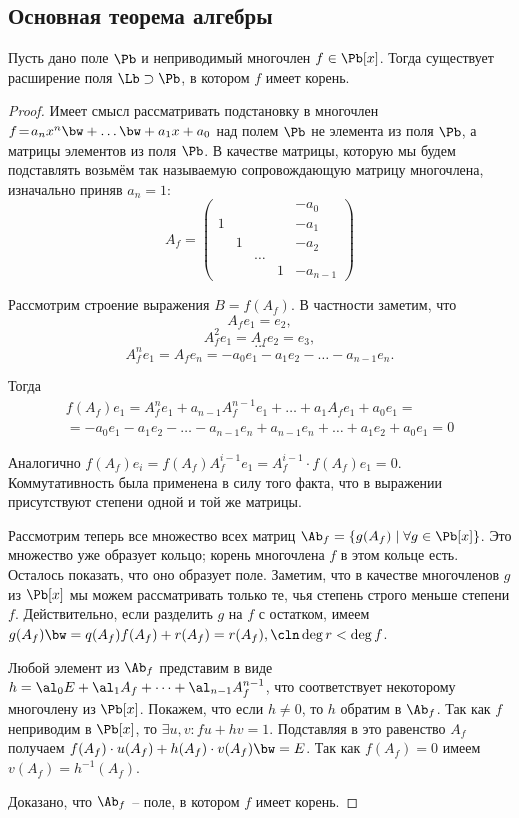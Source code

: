 \subsection{Основная теорема алгебры}

\begin{theorem}
  Пусть дано поле $\Pb$ и неприводимый многочлен $f\in\Pb[x]$. Тогда существует расширение поля $\Lb\supset\Pb$, в котором $f$ имеет корень.
\end{theorem}
\begin{proof}
  Имеет смысл рассматривать подстановку в многочлен $f\!=\!a_nx^n\bw+\dots\bw+a_1x+a_0$ над полем $\Pb$ не элемента из поля $\Pb$, а матрицы элементов из поля $\Pb$. В качестве матрицы, которую мы будем подставлять возьмём так называемую сопровождающую матрицу многочлена, изначально приняв $a_n=1$:
$$
A_f=\left(
\begin{matrix}
  & &      & & -a_0\\
 1& &      & & -a_1\\
  &1&      & & -a_2\\
  & &\dots & &     \\
  & &      &1& -a_{n-1}
\end{matrix}
\right)
$$

Рассмотрим строение выражения $B=f(A_f)$. В частности заметим, что
$$A_fe_1=e_2,$$
$$A^2_fe_1 = A_fe_2=e_3,$$
$$\dots$$
$$A^n_fe_1 = A_fe_n=-a_0e_1-a_1e_2-\dots-a_{n-1}e_n.$$

Тогда
\begin{multline*}f(A_f)e_1 = A_f^ne_1+a_{n-1}A^{n-1}_fe_1+\dots+a_1A_fe_1+a_0e_1=\\=-a_0e_1-a_1e_2-\dots-a_{n-1}e_n+a_{n-1}e_n+\dots+a_1e_2+a_0e_1=0\end{multline*}

Аналогично $f(A_f)e_i=f(A_f)A_f^{i-1}e_1=A_f^{i-1}\cdot
f(A_f)e_1=0$. Коммутативность была применена в силу того факта, что в
выражении присутствуют степени одной и той же матрицы.

Рассмотрим теперь все множество всех матриц $\Ab_f = \{g(A_f)\mid \forall g\in\Pb[x]\}$. Это множество уже образует кольцо; корень многочлена $f$ в этом кольце есть. Осталось показать, что оно образует поле. Заметим, что в качестве многочленов $g$ из $\Pb[x]$ мы можем рассматривать только те, чья степень строго меньше степени $f$. Действительно, если разделить $g$ на $f$ с остатком, имеем $g(A_f)\bw=q(A_f)f(A_f)+r(A_f)=r(A_f),\cln\deg r<\deg f$.

Любой элемент из $\Ab_f$ представим в виде $h=\al_0E+\al_1A_f+\dots+\al_{n-1}A_f^{n-1}$, что соответствует некоторому многочлену из $\Pb[x]$. Покажем, что если $h\ne0$, то $h$ обратим в $\Ab_f$. Так как $f$ неприводим в $\Pb[x]$, то $\exists u,v\colon fu+hv=1$. Подставляя в это равенство $A_f$ получаем $f(A_f)\cdot u(A_f)+h(A_f)\cdot v(A_f)\bw=E$. Так как $f(A_f)=0$ имеем $v(A_f)=h^{-1}(A_f)$.

Доказано, что $\Ab_f$ -- поле, в котором $f$ имеет корень.
\end{proof}

